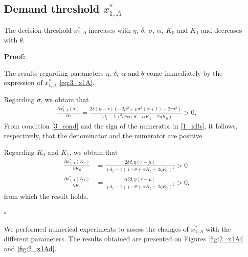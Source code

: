 \subsection{Demand threshold $x_{1,A}^*$}
\label{3_dmx1A}


\begin{prop}
	\label{3_propx1A}
	The decision threshold $x_{1,A}^*$ increases with $\eta, \ \delta, \ \sigma, \ \alpha, \ K_0$ and $K_1$ and decreases with $\theta$.
\end{prop}

\textbf{Proof:}

The results regarding parameters $\eta, \ \delta, \ \alpha $ and $\theta$ come immediately by the expression of $x_{1,A}^*$  \eqref{eq:3_x1A}.

Regarding $\sigma$, we obtain that
\begin{align*}
\frac{\partial x_{1,A}^* ( \sigma) }{\partial \sigma}=\frac{2 \delta  (\mu -r) \left(-2 \mu ^2+\mu  \sigma ^2 \left(\phi+1\right)-2 r \sigma ^2\right)}{(d_1-1)^2 \sigma ^5 \phi (\theta -\alpha  K_1 -2 \eta  K_0)}>0,
\end{align*}
From condition \eqref{3_cond} and the sign of the numerator in \eqref{1_xBs}, it follows, respectively, that the denominator and the numerator are positive.   %

Regarding $K_0$ and $K_1$, we obtain that
\begin{align*}
\frac{\partial x_{1,A}^* ( K_0) }{\partial K_0}&=\frac{2 \delta d_1 \eta  (r-\mu )}{(d_1-1) (-\theta +\alpha  K_1+2 \eta  K_0)^2}>0\\
\frac{\partial x_{1,A}^* ( K_1) }{\partial K_1}&=\frac{\alpha \delta d_1 \eta  (r-\mu )}{(d_1-1) (-\theta +\alpha  K_1+2 \eta  K_0)^2}>0,
\end{align*}
from which the result holds.
\begin{flushright}
	$\square$
\end{flushright}


We performed numerical experiments to assess the changes of $x^*_{1,A}$ with the different parameters. The results obtained are presented on Figures \ref{fig:2_x1Ai} and \ref{fig:2_x1Ad}.


